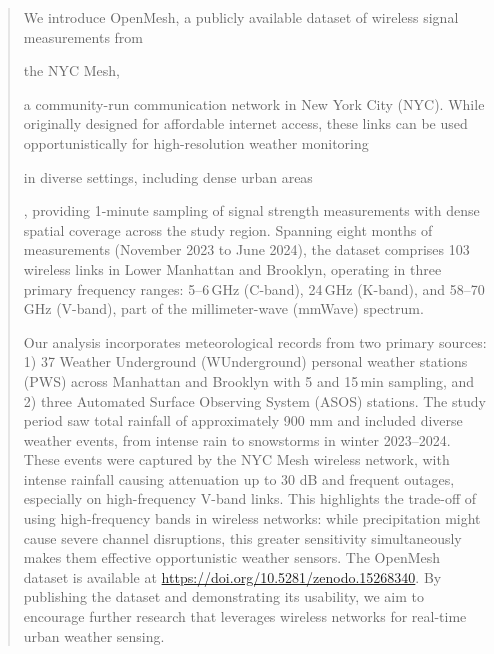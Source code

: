 \documentclass[manuscript]{copernicus}
\newif\ifshowrevisions
\newcommand{\blue}[1]{%
  \ifshowrevisions
    \textcolor{black}{#1}%
  \else
    #1%
  \fi
}
\begin{document}
\begin{abstract}
We introduce OpenMesh, a publicly available dataset of wireless signal measurements from \blue{the NYC Mesh,} a community-run communication network in New York City (NYC). While originally designed for affordable internet access, these links can be used opportunistically for high-resolution weather monitoring \blue{in diverse settings, including dense urban areas}, providing 1-minute sampling of signal strength measurements with dense spatial coverage across the study region.
Spanning eight months of measurements (November 2023 to June 2024), the dataset comprises 103 wireless links in Lower Manhattan and Brooklyn, operating in three primary frequency ranges: 5--6\,GHz (C-band), 24\,GHz (K-band), and 58--70\,GHz (V-band), part of the millimeter-wave (mmWave) spectrum.

Our analysis incorporates meteorological records from two primary sources: 1) 37 Weather Underground (WUnderground) personal weather stations (PWS) across Manhattan and Brooklyn with 5 and 15\,min sampling, and 2) three Automated Surface Observing System (ASOS) stations.
The study period saw total rainfall of approximately 900 mm and included diverse weather events, from intense rain to snowstorms in winter 2023--2024. These events were captured by the NYC Mesh wireless network, with intense rainfall causing attenuation up to 30 dB and frequent outages, especially on high-frequency V-band links. This highlights the trade-off of using high-frequency bands in wireless networks: while precipitation might cause severe channel disruptions, this greater sensitivity simultaneously makes them effective opportunistic weather sensors.
The OpenMesh dataset is available at \url{https://doi.org/10.5281/zenodo.15268340}\citep{Jacoby2025OpenMesh}.
By publishing the dataset and demonstrating its usability, we aim to encourage further research that leverages wireless networks for real-time urban weather sensing.
\end{abstract}

\end{document}
